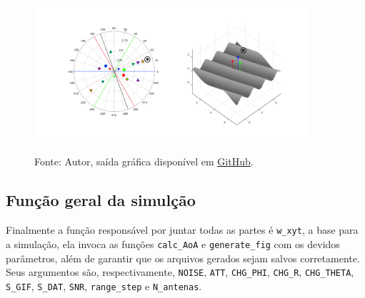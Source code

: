 \begin{figure}[htbp]
	\centering
	\caption{Exemplo de quadro da animação de saída da função \lstinline|generate_fig|.}
	\includegraphics[width=0.9\textwidth]{../pictures/simul_POLY_3_R_50.png}
	\label{fig:example:simul_POLY_3_R_50}
	\caption*{Fonte: Autor, saída gráfica disponível em \href{https://github.com/HeckRodSav/TG/blob/main/documentation/pictures/POLY_3/simul_POLY_3_R_50.gif}{\underline{GitHub}}.}
\end{figure}

\subsection{Função geral da simulção}


Finalmente a função responsável por juntar todas as partes é \lstinline|w_xyt|, a base para a simulação, ela invoca as funções \lstinline|calc_AoA| e \lstinline|generate_fig| com os devidos parâmetros, além de garantir que os arquivos gerados sejam salvos corretamente.
Seus argumentos são, respectivamente, \lstinline|NOISE|, \lstinline|ATT|, \lstinline|CHG_PHI|, \lstinline|CHG_R|, \lstinline|CHG_THETA|, \lstinline|S_GIF|, \lstinline|S_DAT|, \lstinline|SNR|, \lstinline|range_step| e \lstinline|N_antenas|.



